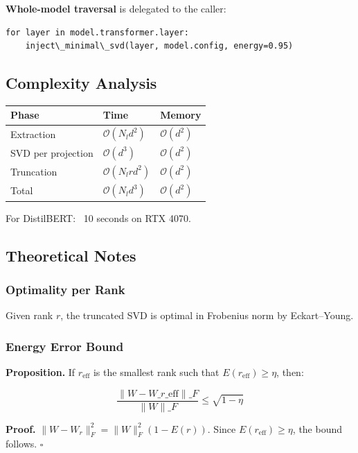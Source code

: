 \textbf{Whole-model traversal} is delegated to the caller:

\begin{lstlisting}
for layer in model.transformer.layer:
    inject\_minimal\_svd(layer, model.config, energy=0.95)
\end{lstlisting}

\subsection{Complexity Analysis}

\begin{table}[H]
\centering
\small
\begin{tabular}{lll}
\toprule
\textbf{Phase} & \textbf{Time} & \textbf{Memory} \\
\midrule
Extraction & $\mathcal{O}(N_l d^2)$ & $\mathcal{O}(d^2)$ \\
SVD per projection & $\mathcal{O}(d^3)$ & $\mathcal{O}(d^2)$ \\
Truncation & $\mathcal{O}(N_l r d^2)$ & $\mathcal{O}(d^2)$ \\
Total & $\mathcal{O}(N_l d^3)$ & $\mathcal{O}(d^2)$ \\
\bottomrule
\end{tabular}
\end{table}

For DistilBERT: ~10 seconds on RTX 4070.

\subsection{Theoretical Notes}

\subsubsection{Optimality per Rank}

Given rank $r$, the truncated SVD is optimal in Frobenius norm by 
Eckart--Young.

\subsubsection{Energy Error Bound}

\textbf{Proposition.} If $r_\text{eff}$ is the smallest rank such that 
$E(r_\text{eff}) \geq \eta$, then:

\[
\frac{\|W - W\_{r\_\text{eff}}\|\_F}{\|W\|\_F} \leq \sqrt{1 - \eta}
\tag{4.9}
\]

\textbf{Proof.} $\|W - W_r\|_F^2 = \|W\|_F^2(1 - E(r))$. Since 
$E(r_\text{eff}) \geq \eta$, the bound follows. $\square$

